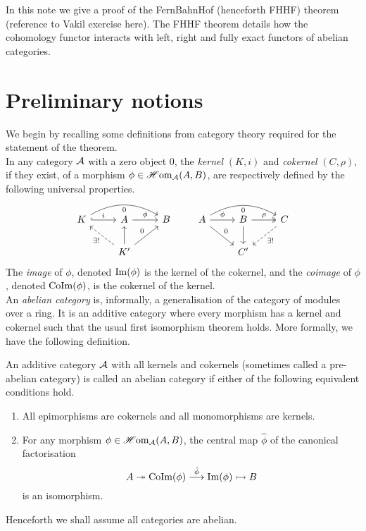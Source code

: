 \documentclass[a4paper]{article}
\def\mono{\rightarrowtail}
\def\epi{\twoheadrightarrow}
\begin{document}
\maketitle
In this note we give a proof of the FernBahnHof (henceforth FHHF) theorem (reference to Vakil exercise here). The FHHF theorem details how the cohomology functor interacts with left, right and fully exact functors of abelian categories.
\section{Preliminary notions}
We begin by recalling some definitions from category theory required for the statement of the theorem.\\
In any category $\mathcal{A}$ with a zero object $0$, the \emph{kernel} $(K,i)$ and \emph{cokernel} $(C,\rho)$, if they exist, of a morphism $\phi \in \operatorname{\mathscr{H}om}_{\mathcal{A}}(A,B)$, are respectively defined by the following universal properties.
\[
    \begin{tikzcd}
        K \arrow[r, "i", hook] \arrow[rr, "0"', bend left]& A \arrow[r, "\phi"] & B \\
        & K' \arrow[lu, "\exists!", dashed] \arrow[u] \arrow[ur, "0"] &
    \end{tikzcd}
    \qquad
    \begin{tikzcd}
        A \arrow[r, "\phi"] \arrow[rr, "0"', bend left] \arrow[rd, "0"]& B \arrow[d] \arrow[r, "\rho", two heads] & C \arrow[ld, "\exists!", dashed]\\
        & C' &
    \end{tikzcd}
\]
The \emph{image} of $\phi$, denoted $\operatorname{Im}(\phi)$ is the kernel of the cokernel, and the \emph{coimage} of $\phi$, denoted $\operatorname{CoIm}(\phi)$, is the cokernel of the kernel.\\


An \emph{abelian category} is, informally, a generalisation of the category of modules over a ring. It is an additive category where every morphism has a kernel and cokernel such that the usual first isomorphism theorem holds. More formally, we have the following definition.
\begin{Definition}
    An additive category $\mathcal{A}$ with all kernels and cokernels (sometimes called a pre-abelian category) is called an abelian category if either of the following equivalent conditions hold.
    \begin{enumerate}
        \item All epimorphisms are cokernels and all monomorphisms are kernels.
        \item For any morphism $\phi\in \operatorname{\mathscr{H}om}_{\mathcal{A}}(A,B)$, the central map $\hat{\phi}$ of the canonical factorisation
            \[
                A \epi \CoIm(\phi) \stackrel{\hat{\phi}}{\to} \im(\phi) \mono B
            \]
            is an isomorphism.
    \end{enumerate}
\end{Definition}
Henceforth we shall assume all categories are abelian.\\
\end{document}
